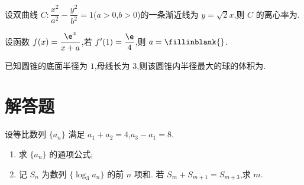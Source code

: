 \begin{problem}
设双曲线 \(C:\dfrac{x^2}{a^2}-\dfrac{y^2}{b^2}=1\)(\(a>0\),\(b>0\))的一条渐近线为 \(y=\sqrt2x\),则 \(C\) 的离心率为\fillinblank{}.
\end{problem}

\begin{problem}
设函数 \(f(x)=\dfrac{\e^x}{x+a}\),若 \(f'(1)=\dfrac{\e}{4}\),则 \(a=\fillinblank{}\).
\end{problem}

\begin{problem}
已知圆锥的底面半径为 \(1\),母线长为 \(3\),则该圆锥内半径最大的球的体积为\fillinblank{}.
\end{problem}

\section{解答题}

\begin{problem}
设等比数列 \(\{a_n\}\) 满足 \(a_1+a_2=4\),\(a_3-a_1=8\).

\begin{enumerate}
    \item 求 \(\{a_n\}\) 的通项公式;
    \item 记 \(S_n\) 为数列 \(\{\log_3 a_n\}\) 的前 \(n\) 项和. 若 \(S_m+S_{m+1}=S_{m+3}\),求 \(m\).
\end{enumerate}
\end{problem}

